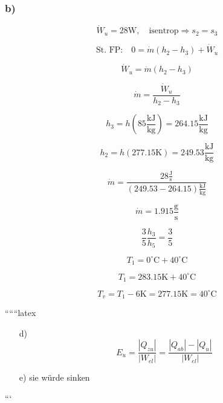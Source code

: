 \subsubsection*{b)}
\[
\dot{W}_u = 28 \text{W}, \quad \text{isentrop} \Rightarrow s_2 = s_3
\]

\[
\text{St. FP:} \quad 0 = \dot{m} (h_2 - h_3) + \dot{W}_u
\]

\[
\dot{W}_u = \dot{m} (h_2 - h_3)
\]

\[
\dot{m} = \frac{\dot{W}_u}{h_2 - h_3}
\]

\[
h_3 = h \left( 85 \frac{\text{kJ}}{\text{kg}} \right) = 264.15 \frac{\text{kJ}}{\text{kg}}
\]

\[
h_2 = h \left( 277.15 \text{K} \right) = 249.53 \frac{\text{kJ}}{\text{kg}}
\]

\[
\dot{m} = \frac{28 \frac{\text{J}}{\text{s}}}{\left( 249.53 - 264.15 \right) \frac{\text{kJ}}{\text{kg}}}
\]

\[
\dot{m} = 1.915 \frac{\text{g}}{\text{s}}
\]

\[
\frac{3}{5} \frac{h_3}{h_5} = \frac{3}{5}
\]

\[
T_1 = 0^\circ \text{C} + 40^\circ \text{C}
\]

\[
T_1 = 283.15 \text{K} + 40^\circ \text{C}
\]

\[
T_v = T_1 - 6 \text{K} = 277.15 \text{K} = 40^\circ \text{C}
\]

``````latex


\begin{itemize}
    \item[d)] \[
    E_u = \frac{|Q_{zu}|}{|W_{el}|} = \frac{|Q_{ab}| - |Q_{u}|}{|W_{el}|}
    \]
    \item[e)] sie würde sinken
\end{itemize}

```